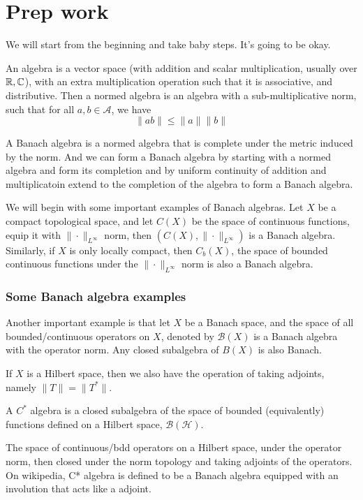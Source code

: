\chapter{Prep work}
We will start from the beginning and take baby steps. It's going to be okay.


An algebra is a vector space (with addition and scalar multiplication, usually over $\mathbb{R}, \mathbb{C}$), with an extra multiplication operation such that it is associative, and distributive. Then a normed algebra is an algebra with a sub-multiplicative norm, such that for all $a,b\in\mathcal{A}$, we have
\begin{equation*}
    \|ab\|\leq\|a\|\|b\|
\end{equation*}
\begin{comment}
    We don't know how to multiply two vectors if we are just given a vector space. Hence giving it a norm gives us the ability to multiply. Note such multiplication is only sub-multiplicative.
\end{comment}

A Banach algebra is a normed algebra that is complete under the metric induced by the norm. And we can form a Banach algebra by starting with a normed algebra and form its completion and by uniform continuity of addition and multiplicatoin extend to the completion of the algebra to form a Banach algebra.

We will begin with some important examples of Banach algebras.
Let $X$ be a compact topological space, and let $C(X)$ be the space of continuous functions, equip it with $\|\cdot\|_{L^\infty}$ norm, then $(C(X), \|\cdot\|_{L^\infty})$ is a Banach algebra. Similarly, if $X$ is only locally compact, then $C_b(X)$, the space of bounded continuous functions under the $\|\cdot\|_{L^\infty}$ norm is also a Banach algebra.
\subsection{Some Banach algebra examples}

Another important example is that let $X$ be a Banach space, and the space of all bounded/continuous operators on $X$, denoted by $\mathcal{B}(X)$ is a Banach algebra with the operator norm. Any closed subalgebra of $B(X)$ is also Banach.

If $X$ is a Hilbert space, then we also have the operation of taking adjoints, namely $\|T\|=\|T^*\|$.



\begin{definition}
    A $C^*$ algebra is a closed subalgebra of the space of bounded (equivalently) functions defined on a Hilbert space, $\mathcal{B}(\mathcal{H})$. 
\end{definition}
\begin{remark}
    The space of continuous/bdd operators on a Hilbert space, under the operator norm, then closed under the norm topology and taking adjoints of the operators. On wikipedia, C* algebra is defined to be a Banach algebra equipped with an involution that acts like a adjoint.
\end{remark}


